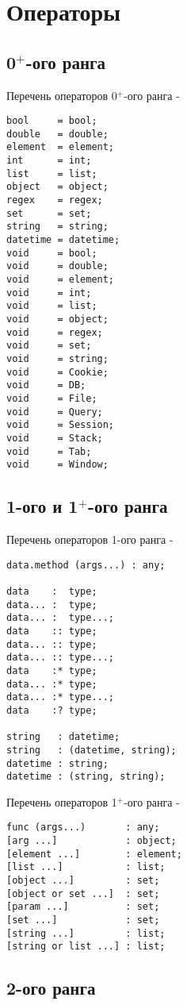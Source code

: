 \section{Операторы}

\subsection{0$^+$-ого ранга}

\noindent Перечень операторов 0$^+$-ого ранга -
\begin{verbatim}
bool     = bool;
double   = double;
element  = element;
int      = int;
list     = list;
object   = object;
regex    = regex;
set      = set;
string   = string;
datetime = datetime;
void     = bool;
void     = double;
void     = element;
void     = int;
void     = list;
void     = object;
void     = regex;
void     = set;
void     = string;
void     = Cookie;
void     = DB;
void     = File;
void     = Query;
void     = Session;
void     = Stack;
void     = Tab;
void     = Window;
\end{verbatim}

\subsection{1-ого и 1$^+$-ого ранга}
\noindent Перечень операторов 1-ого ранга -
\begin{verbatim}
data.method (args...) : any;

data    :  type;
data... :  type;
data... :  type...;
data    :: type;
data... :: type;
data... :: type...;
data    :* type;
data... :* type;
data... :* type...;
data    :? type;

string   : datetime;
string   : (datetime, string);
datetime : string;
datetime : (string, string);
\end{verbatim}

\noindent Перечень операторов 1$^+$-ого ранга -
\begin{verbatim}
func (args...)       : any;
[arg ...]            : object;
[element ...]        : element;
[list ...]           : list;
[object ...]         : set;
[object or set ...]  : set;
[param ...]          : set;
[set ...]            : set;
[string ...]         : list;
[string or list ...] : list;
\end{verbatim}

\subsection{2-ого ранга}

